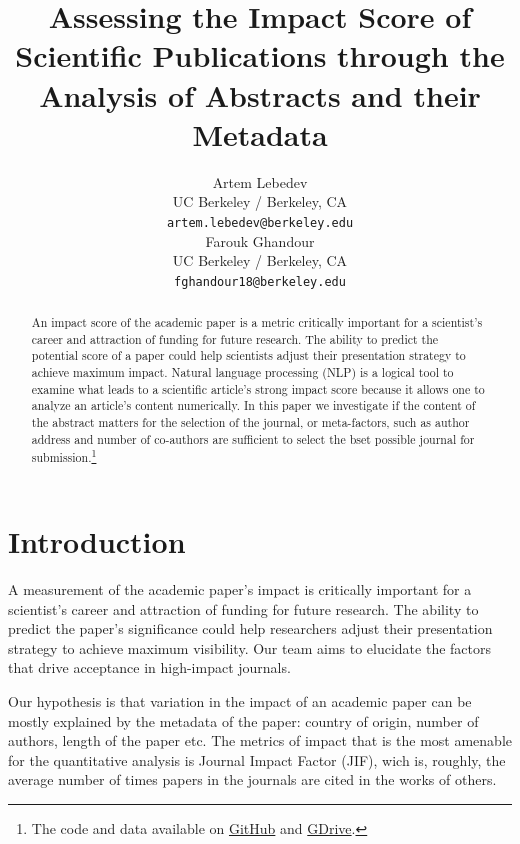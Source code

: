 \documentclass[11pt]{article}
\title{Assessing the Impact Score of Scientific Publications through the Analysis of Abstracts and their Metadata}
\author{Artem Lebedev\\
  UC Berkeley / Berkeley, CA \\
  \texttt{artem.lebedev@berkeley.edu} \\\And
 Farouk Ghandour \\
  UC Berkeley / Berkeley, CA \\
  \texttt{fghandour18@berkeley.edu} \\}
\begin{document}
\maketitle

\begin{abstract}
An impact score of the academic paper is a metric critically important for a scientist's career and attraction of funding for future research. The ability to predict the potential score of a paper could help scientists adjust their presentation strategy to achieve maximum impact. Natural language processing (NLP) is a logical tool to examine what leads to a scientific article's strong impact score because it allows one to analyze an article’s content numerically. In this paper we investigate if the content of the abstract matters for the selection of the journal, or meta-factors, such as author address and number of co-authors are sufficient to select the bset possible journal for submission.\footnote{The code and data available on \href{https://github.com/ArtemChemist/w266_project}{GitHub} and \href{https://drive.google.com/drive/folders/1OkSzswtFvqA6_FD35vvSCU31kSd1ECA2?usp=drive_link}{GDrive}.}
\end{abstract}

\section{Introduction}
A measurement of the academic paper's impact is critically important for a scientist's career and attraction of funding for future research. The ability to predict the paper's significance could help researchers adjust their presentation strategy to achieve maximum visibility. Our team aims to elucidate the factors that drive acceptance in high-impact journals.

Our hypothesis is that variation in the impact of an academic paper can be mostly explained by the metadata of the paper: country of origin, number of authors, length of the paper etc. The metrics of impact that is the most amenable for the quantitative analysis is Journal Impact Factor (JIF), wich is, roughly, the average number of times papers in the journals are cited in the works of others.   
\end{document}
